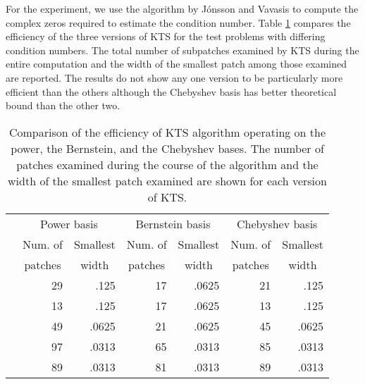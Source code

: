 \documentclass[12pt]{article}
\begin{document}
For the experiment, we use the algorithm by J\'{o}nsson and
Vavasis \cite{jonsson} to compute the complex zeros required to
estimate the condition number. Table \ref{table_ba} compares the
efficiency of the three versions of KTS for the test problems
with differing condition numbers. The total number of subpatches
examined by KTS during the entire computation and the width of
the smallest patch among those examined are reported. The results
do not show any one version to be particularly more efficient than
the others although the Chebyshev basis has better theoretical
bound than the other two.
\begin{table}
\caption{Comparison of the efficiency of KTS algorithm
operating on the power, the Bernstein, and the Chebyshev bases.
The number of patches examined during the course of the algorithm
and the width of the smallest patch examined are shown for each
version of KTS. \label{table_ba} }
\begin{center}
\begin{tabular}{|r|r|r|r|r|r|r|}
\hline
 & \multicolumn{2}{c}{Power basis} \vline& \multicolumn{2}{c}{Bernstein basis}\vline & \multicolumn{2}{c}{Chebyshev basis}\vline\\
\cline{2-7}
 & Num. of & Smallest & Num. of & Smallest & Num. of & Smallest\\
& \multicolumn{1}{c}{patches}\vline &
\multicolumn{1}{c}{width}\vline &
\multicolumn{1}{c}{patches}\vline &
\multicolumn{1}{c}{width}\vline
& \multicolumn{1}{c}{patches}\vline & \multicolumn{1}{c}{width}\vline\\
\hline \hline
 & 29 & .125 & 17 & .0625 & 21 & .125 \\
 & 13 & .125 & 17 & .0625 & 13 & .125 \\
 & 49 & .0625 & 21 & .0625 & 45 & .0625 \\
 & 97 & .0313 & 65 & .0313 & 85 & .0313 \\
 & 89 & .0313 & 81 & .0313 & 89 & .0313 \\
\hline
\end{tabular}
\end{center}
\end{table}
\end{document}

